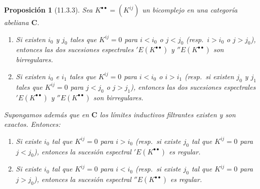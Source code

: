 \documentclass[10pt,oneside,openany]{book}
\theoremstyle{egaenv}\newtheorem*{env}{---}
\theoremstyle{egastatement}
\newtheorem*{proposition}{Proposición}
\theoremstyle{egadescription}
\begin{document}
\begin{proposition}[11.3.3]
\label{0.11.3.3}
\label{0.11.3.3-fr}
Sea $K^{\bullet\bullet}=(K^{ij})$ un bicomplejo en una categoría abeliana $\boldsymbol{C}$.
\begin{enumerate}
  \item[{\rm(i)}] Si existen $i_0$ y $j_0$ tales que $K^{ij}=0$ para $i<i_0$ o $j<j_0$ \textup{(resp.}~$i>i_0$ o $j>j_0$), entonces las dos sucesiones espectrales $'E(K^{\bullet\bullet})$ y $''E(K^{\bullet\bullet})$ son birregulares.
  \item[{\rm(ii)}] Si existen $i_0$ e $i_1$ tales que $K^{ij}=0$ para $i<i_0$ o $i>i_1$ \textup{(resp.}~si existen $j_0$ y $j_1$ tales que $K^{ij}=0$ para $j<j_0$ o $j>j_1$), entonces las dos sucesiones espectrales $'E(K^{\bullet\bullet})$ y $''E(K^{\bullet\bullet})$ son birregulares.
\end{enumerate}
Supongamos además que en $\boldsymbol{C}$ los límites inductivos filtrantes existen y son exactos. Entonces:
\begin{enumerate}
\item[\textup{(iii)}] Si existe $i_0$ tal que $K^{ij}=0$ para $i>i_0$ \textup{(resp.}~si existe $j_0$ tal que $K^{ij}=0$ para $j<j_0$), entonces la sucesión espectral $'E(K^{\bullet\bullet})$ es regular.
  \item[{\rm(iv)}] Si existe $i_0$ tal que $K^{ij}=0$ para $i<i_0$ \textup{(resp.}~si existe $j_0$ tal que $K^{ij}=0$ para $j>j_0$), entonces la sucesión espectral $''E(K^{\bullet\bullet})$ es regular.
\end{enumerate}
\end{proposition}
\end{document}

